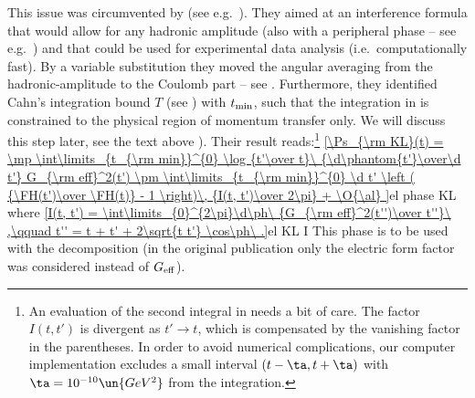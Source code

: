 
This issue was circumvented by \KaL{} (see e.g.~). They aimed at an interference formula that would allow for any hadronic amplitude (also with a peripheral phase -- see e.g.~) and that could be used for experimental data analysis (i.e.~computationally fast). By a variable substitution they moved the angular averaging from the hadronic-amplitude to the Coulomb part -- see . Furthermore, they identified Cahn's integration bound $T$ (see ) with $t_{\rm min}$, such that the integration in  is constrained to the physical region of momentum transfer only. We will discuss this step later, see the text above ). Their result reads:\footnote{%
An evaluation of the second integral in  needs a bit of care. The factor $I(t, t')$ is divergent as $t'\to t$, which is compensated by the vanishing factor in the parentheses. In order to avoid numerical complications, our computer implementation excludes a small interval $(t-\ta, t+\ta)$ with $\ta = 10^{-10}\un{GeV^2}$ from the integration.
}
\eqref{\Ps_{\rm KL}(t) =
	\mp \int\limits_{t_{\rm min}}^{0} \log {t'\over t}\ {\d\phantom{t'}\over\d t'} G_{\rm eff}^2(t')
	\pm \int\limits_{t_{\rm min}}^{0} \d t' \left ( {\FH(t')\over \FH(t)} - 1 \right)\, {I(t, t')\over 2\pi}
	+ \O{\al}
}{el phase KL}
where
\eqref{I(t, t') = \int\limits_{0}^{2\pi}\d\ph\ {G_{\rm eff}^2(t'')\over t''}\ ,\qquad t'' = t + t' + 2\sqrt{t t'} \cos\ph\ .}{el KL I}
This phase is to be used with the decomposition  (in the original publication  only the electric form factor was considered instead of $G_{\rm eff}$).


